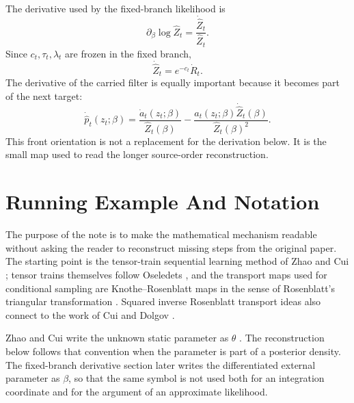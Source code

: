 \documentclass[11pt]{article}
\numberwithin{equation}{section}
\begin{document}
The derivative used by the fixed-branch likelihood is
\begin{equation}
    \partial_\beta\log\widehat Z_t
    =
    \frac{\dot{\widehat Z}_t}{\widehat Z_t}.
    \label{eq:p24-p22-o16}
\end{equation}
Since \(c_t,\tau_t,\lambda_t\) are frozen in the fixed branch,
\begin{equation}
    \dot{\widehat Z}_t=e^{-c_t}\dot R_t.
    \label{eq:p24-p22-o17}
\end{equation}
The derivative of the carried filter is equally important because it becomes
part of the next target:
\begin{equation}
    \dot{\widehat p}_t(z_t;\beta)
    =
    \frac{\dot a_t(z_t;\beta)}{\widehat Z_t(\beta)}
    -
    \frac{a_t(z_t;\beta)\dot{\widehat Z}_t(\beta)}
    {\widehat Z_t(\beta)^2}.
    \label{eq:p24-p22-o18}
\end{equation}
This front orientation is not a replacement for the derivation below.  It is
the small map used to read the longer source-order reconstruction.

\section{Running Example And Notation}

The purpose of the note is to make the mathematical mechanism readable without
asking the reader to reconstruct missing steps from the original paper.  The
starting point is the tensor-train sequential learning method of Zhao and Cui
\cite{zhao2024ttsequential}; tensor trains themselves follow Oseledets
\cite{oseledets2011tt}, and the transport maps used for conditional sampling
are Knothe--Rosenblatt maps in the sense of Rosenblatt's triangular
transformation \cite{rosenblatt1952remarks}.  Squared inverse Rosenblatt
transport ideas also connect to the work of Cui and Dolgov
\cite{cui2021deep}.

Zhao and Cui write the unknown static parameter as \(\theta\)
\cite{zhao2024ttsequential}.  The reconstruction below follows that convention
when the parameter is part of a posterior density.  The fixed-branch derivative
section later writes the differentiated external parameter as \(\beta\), so
that the same symbol is not used both for an integration coordinate and for the
argument of an approximate likelihood.
\end{document}

